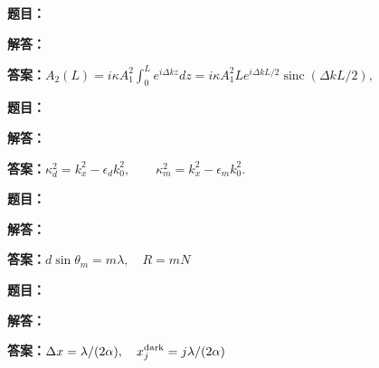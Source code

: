 \documentclass[lang=cn,color=blue,11pt]{elegantbook}
\begin{document}
\noindent\textbf{题目：}
\par\noindent\textbf{解答：}
\par\noindent\textbf{答案：}\(\displaystyle 
A_2(L)=i\kappa A_1^2\int_0^Le^{i\Delta kz}dz
=i\kappa A_1^2Le^{i\Delta kL/2}
\operatorname{sinc}(\Delta kL/2),
\)\par
\par\smallskip\noindent\hrulefill\par\medskip
{}\par
\noindent\textbf{题目：}
\par\noindent\textbf{解答：}
\par\noindent\textbf{答案：}\(\displaystyle 
\kappa_d^2=k_x^2-\epsilon_dk_0^2,\qquad
\kappa_m^2=k_x^2-\epsilon_mk_0^2.
\)\par
\par\smallskip\noindent\hrulefill\par\medskip
{}\par
\noindent\textbf{题目：}
\par\noindent\textbf{解答：}
\par\noindent\textbf{答案：}\(\displaystyle d\sin\theta_m=m\lambda,\quad R=mN\)\par
\par\smallskip\noindent\hrulefill\par\medskip
{}\par
\noindent\textbf{题目：}
\par\noindent\textbf{解答：}
\par\noindent\textbf{答案：}\(\displaystyle \Delta x=\lambda/(2\alpha),\quad x_j^{\rm dark}=j\lambda/(2\alpha)\)\par
\par\smallskip\noindent\hrulefill\par\medskip
{}\par
\end{document}
